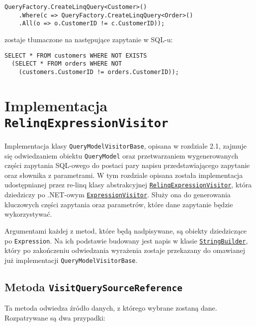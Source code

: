 \begin{enumerate}[a)]
\begin{lstlisting}
QueryFactory.CreateLinqQuery<Customer>()
    .Where(c => QueryFactory.CreateLinqQuery<Order>()
    .All(o => o.CustomerID != c.CustomerID));
\end{lstlisting}

zostaje tłumaczone na następujące zapytanie w SQL-u:

\begin{lstlisting}
SELECT * FROM customers WHERE NOT EXISTS 
  (SELECT * FROM orders WHERE NOT
    (customers.CustomerID != orders.CustomerID));
\end{lstlisting}

\end{enumerate}

\section{Implementacja \texttt{RelinqExpressionVisitor}}
Implementacja klasy \texttt{QueryModelVisitorBase}, opisana w rozdziale 2.1, zajmuje się odwiedzaniem obiektu \texttt{QueryModel} oraz przetwarzaniem wygenerowanych części zapytania SQL-owego do postaci pary napisu przedstawiającego zapytanie oraz słownika z parametrami. W tym rozdziale opisana została implementacja udostępnianej przez re-linq klasy abstrakcyjnej \href{https://github.com/re-motion/Relinq/blob/82fdca6a4bfd942bb4a71dd20ab9c5af0aea0541/Core/Parsing/RelinqExpressionVisitor.cs}{\texttt{RelinqExpressionVisitor}}, która dziedziczy po .NET-owym \href{https://msdn.microsoft.com/en-us/library/system.linq.expressions.expressionvisitor(v=vs.110).aspx}{\texttt{ExpressionVisitor}}. Służy ona do generowania kluczowych części zapytania oraz parametrów, które dane zapytanie będzie wykorzystywać.

Argumentami każdej z metod, które będą nadpisywane, są obiekty dziedziczące po \texttt{Expression}. Na ich podstawie budowany jest napis w klasie \href{https://msdn.microsoft.com/pl-pl/library/system.text.stringbuilder(v=vs.110).aspx}{\texttt{StringBuilder}}, który po zakończeniu odwiedzania wyrażenia zostaje przekazany do omawianej już implementacji \texttt{QueryModelVisitorBase}.

\subsection{Metoda \texttt{VisitQuerySourceReference}}
Ta metoda odwiedza źródło danych, z którego wybrane zostaną dane. Rozpatrywane są dwa przypadki:

